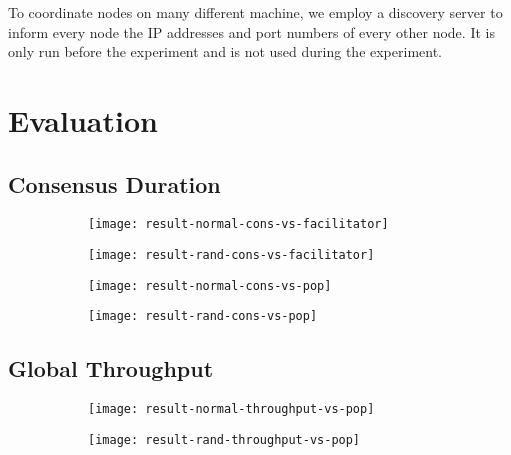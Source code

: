 To coordinate nodes on many different machine,
we employ a discovery server to inform every node the IP addresses and port numbers of every other node.
It is only run before the experiment and is not used during the experiment.


\section{Evaluation}
\label{sec:evaluation}

\subsection{Consensus Duration}

\begin{figure}[h]
  \centering
  \begin{subfigure}{\textwidth}
    \texttt{[image: result-normal-cons-vs-facilitator]}
  \end{subfigure}

  \begin{subfigure}{\textwidth}
    \texttt{[image: result-rand-cons-vs-facilitator]}
  \end{subfigure}
\end{figure}

\begin{figure}[h]
  \centering
  \begin{subfigure}{\textwidth}
    \texttt{[image: result-normal-cons-vs-pop]}
  \end{subfigure}

  \begin{subfigure}{\textwidth}
    \texttt{[image: result-rand-cons-vs-pop]}
  \end{subfigure}
\end{figure}

\subsection{Global Throughput}

\begin{figure}[h]
  \centering
  \begin{subfigure}{\textwidth}
    \texttt{[image: result-normal-throughput-vs-pop]}
  \end{subfigure}

  \begin{subfigure}{\textwidth}
    \texttt{[image: result-rand-throughput-vs-pop]}
  \end{subfigure}
\end{figure}
